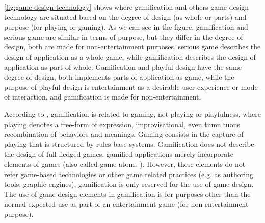 \autoref{fig:game-design-technology} shows where gamification and others game design technology are situated based on the degree of design (as whole or parts) and purpose (for playing or gaming). As we can see in the figure, gamification and serious game are similar in terms of purpose, but they differ in the degree of design, both are made for non-entertainment purposes, serious game describes the design of application as a whole game, while gamification describes the design of application as part of whole. Gamification and playful design have the same degree of design, both implements parts of application as game, while the purpose of playful design is entertainment as a desirable user experience or mode of interaction, and gamification is made for non-entertainment.

According to , gamification is related to gaming, not playing or playfulness, where playing denotes a free-form of expression, improvisational, even tumultuous recombination of behaviors and meanings. Gaming consists in the capture of playing that is structured by rules-base systems. Gamification does not describe the design of full-fledged games, gamified applications merely incorporate elements of games (also called game atoms \cite{BrathwaiteSchreiber2009}). However, these elements do not refer game-based technologies or other game related practices (e.g. as authoring tools, graphic engines), gamification is only reserved for the use of game design. The use of game design elements in gamification is for purposes other than the normal expected use as part of an entertainment game (for non-entertainment purpose).


